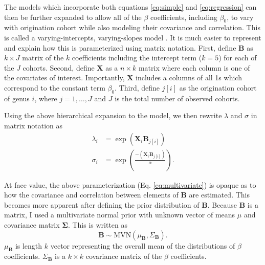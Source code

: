 \documentclass[12pt,letterpaper]{article}
\begin{document}
The models which incorporate both equations \ref{eq:simple} and \ref{eq:regression} can then be further expanded to allow all of the \(\beta\) coefficients, including \(\beta_{0}\), to vary with origination cohort while also modeling their covariance and correlation. This is called a varying-intercepts, varying-slopes model \citep{Gelman2007}. It is much easier to represent and explain how this is parameterized using matrix notation. First, define \(\mathbf{B}\) as \(k \times J\) matrix of the \(k\) coefficients including the intercept term (\(k = 5\)) for each of the \(J\) cohorts. Second, define \(\mathbf{X}\) as a \(n \times k\) matrix where each column is one of the covariates of interest. Importantly, \(\mathbf{X}\) includes a columns of all 1s which correspond to the constant term \(\beta_{0}\). Third, define \(j[i]\) as the origination cohort of genus \(i\), where \(j = 1, \dots, J\) and \(J\) is the total number of observed cohorts.

Using the above hierarchical expansion to the model, we then rewrite \(\lambda\) and \(\sigma\) in matrix notation as
\begin{equation}
  \begin{aligned}
    \lambda_{i} &= \exp(\mathbf{X}_{i} \mathbf{B}_{j[i]}) \\
    \sigma_{i} &= \exp\left(\frac{-(\mathbf{X}_{i} \mathbf{B}_{j[i]})}{\alpha}\right). 
  \end{aligned}
  \label{eq:multivariate}
\end{equation}

At face value, the above parameterization (Eq. \ref{eq:multivariate}) is opaque as to how the covariance and correlation between elements of \(\mathbf{B}\) are estimated. This becomes more apparent after defining the prior distribution of \(\mathbf{B}\). Because \(\mathbf{B}\) is a matrix, I used a multivariate normal prior with unknown vector of means \(\mu\) and covariance matrix \(\mathbf{\Sigma}\). This is written as 
\begin{equation}
  \mathbf{B} \sim \mathrm{MVN}(\mu_{\mathbf{B}}, \Sigma_{\mathbf{B}}).
  \label{eq:beta_prior}
\end{equation}
\(\mu_{\mathbf{B}}\) is length \(k\) vector representing the overall mean of the distributions of \(\beta\) coefficients. \(\Sigma_{\mathbf{B}}\) is a \(k \times k\) covariance matrix of the \(\beta\) coefficients.
\end{document}
